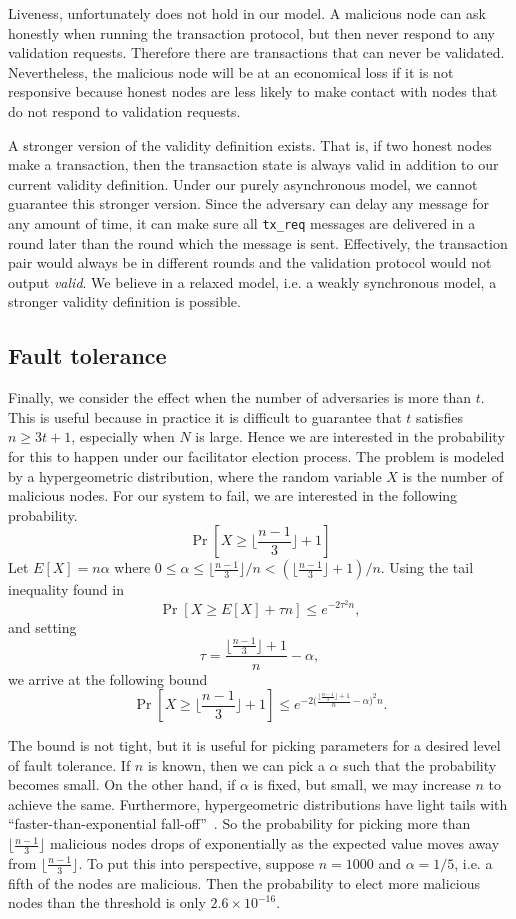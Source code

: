 Liveness, unfortunately does not hold in our model.
A malicious node can ask honestly when running the transaction protocol,
but then never respond to any validation requests.
Therefore there are transactions that can never be validated.
Nevertheless, the malicious node will be at an economical loss if it is not responsive because honest nodes are less likely to make contact with nodes that do not respond to validation requests.

A stronger version of the validity definition exists.
That is, if two honest nodes make a transaction,
then the transaction state is always valid in addition to our current validity definition.
Under our purely asynchronous model, we cannot guarantee this stronger version.
Since the adversary can delay any message for any amount of time,
it can make sure all \texttt{tx\_req} messages are delivered in a round later than the round which the message is sent.
Effectively, the transaction pair would always be in different rounds and the validation protocol would not output \emph{valid}.
We believe in a relaxed model, i.e. a weakly synchronous model, a stronger validity definition is possible.

\subsection{Fault tolerance}
Finally, we consider the effect when the number of adversaries is more than $t$.
This is useful because in practice it is difficult to guarantee that $t$ satisfies $n \ge 3t + 1$,
especially when $N$ is large.
Hence we are interested in the probability for this to happen under our facilitator election process.
The problem is modeled by a hypergeometric distribution,
where the random variable $X$ is the number of malicious nodes.
For our system to fail, we are interested in the following probability.
$$
\Pr[X \ge \lfloor \frac{n-1}{3} \rfloor + 1]
$$
Let $E[X] = n\alpha$ where $0 \le \alpha \le \lfloor \frac{n-1}{3} \rfloor/n < (\lfloor  \frac{n - 1}{3} \rfloor + 1) / n$.
Using the tail inequality found in~\cite{skala2013hypergeometric}
$$
\Pr[X \ge E[X] + \tau n] \le e^{-2\tau^2n},
$$
and setting 
$$
\tau = \frac{\lfloor \frac{n-1}{3} \rfloor + 1}{n} - \alpha,
$$
we arrive at the following bound
$$
\Pr[X \ge \lfloor \frac{n-1}{3} \rfloor + 1] \le e^{-2 \big(\frac{\lfloor  \frac{n - 1}{3} \rfloor + 1}{n} - \alpha \big)^2 n}.
$$

The bound is not tight, but it is useful for picking parameters for a desired level of fault tolerance.
If $n$ is known, then we can pick a $\alpha$ such that the probability becomes small.
On the other hand, if $\alpha$ is fixed, but small, we may increase $n$ to achieve the same.
Furthermore, hypergeometric distributions have light tails with ``faster-than-exponential fall-off''~\cite{skala2013hypergeometric}.
So the probability for picking more than $\lfloor \frac{n-1}{3} \rfloor$ malicious nodes drops of exponentially as the expected value moves away from $\lfloor \frac{n-1}{3} \rfloor$.
To put this into perspective,
suppose $n = 1000$ and $\alpha = 1/5$, i.e. a fifth of the nodes are malicious.
Then the probability to elect more malicious nodes than the threshold is only $2.6 \times 10^{-16}$.



